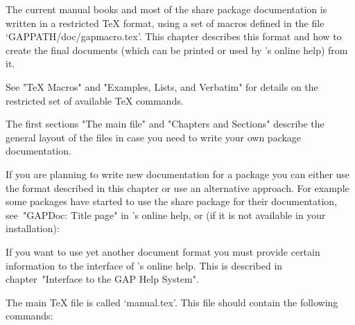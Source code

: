 

The  current  {\GAP}  manual  books  and  most  of  the   share   package
documentation is written in a restricted {\TeX} format, using  a  set  of
macros defined  in  the  file  `GAPPATH/doc/gapmacro.tex'.  This  chapter
describes this format and how to create the final documents (which can be
printed or used by {\GAP}'s online help) from it.

See "TeX Macros" and "Examples, Lists, and Verbatim" for details  on  the
restricted set of available {\TeX} commands.

The first sections "The main file"  and "Chapters and Sections"  describe
the  general  layout of the  files  in case  you need to   write your own
package documentation.

If you are planning to write new documentation for a {\GAP}  package  you
can either use the format described in this chapter or use an alternative
approach.  For  example  some  packages   have   started   to   use   the
 share  package  for  their  documentation,  see~"GAPDoc:
Title page" in {\GAP}'s online help, or (if it is not available  in  your
installation):

If you want to use yet another document format you must  provide  certain
information to the interface of {\GAP}'s online help. This  is  described
in chapter~"Interface to the GAP Help System".


\indextt{\\BeginningOfBook}\indextt{\\UseReferences}
\indextt{\\TitlePage}\indextt{\\Colophon}\indextt{\\TableOfContents}
\indextt{\\OneColumnTableOfContents}
\indextt{\\FrontMatter}\indextt{\\Chapters}\indextt{\\Appendices}
\indextt{\\Bibliography}\indextt{\\Index}\indextt{\\EndOfBook}
\indextt{\\Package}\indextt{\\package}
The main {\TeX} file is called `manual.tex'.
This file should contain the following commands:

